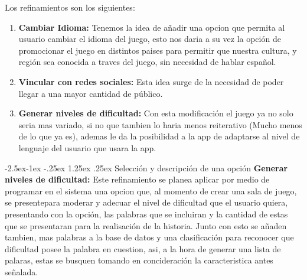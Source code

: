 \documentclass[12pt]{article}
\makeatletter
\renewcommand\paragraph{\@startsection{paragraph}{4}{\z@}%
	{-2.5ex\@plus -1ex \@minus -.25ex}%
	{1.25ex \@plus .25ex}%
	{\normalfont\normalsize\bfseries}}
\makeatother
\begin{document}
Los refinamientos son los siguientes:
\begin{enumerate}[1.]
	\item \textbf{Cambiar Idioma:} Tenemos la idea de añadir una opcion que permita al usuario cambiar el idioma del juego, esto nos daria a su vez la opción de promocionar el juego en distintos paises para permitir que nuestra cultura, y región sea conocida a traves del juego, sin necesidad de hablar español.
	\item \textbf{Vincular con redes sociales:} Esta idea surge de la necesidad de poder llegar a una mayor cantidad de público.
	\item \textbf{Generar niveles de dificultad:} Con esta modificación el juego ya no solo seria mas variado, si no que tambien lo haria menos reiterativo (Mucho menos de lo que ya es), ademas le da la posibilidad a la app de adaptarse al nivel de lenguaje del usuario que usara la app.
\end{enumerate}
\paragraph{Selección y descripción de una opción}
\textbf{Generar niveles de dificultad:} Este refinamiento se planea aplicar por medio de programar en el sistema una opcion que, al momento de crear una sala de juego, se presentepara moderar y adecuar el nivel de dificultad que el usuario quiera, presentando con la opción, las palabras que se incluiran y la cantidad de estas que se presentaran para la realisación de la historia. Junto con esto se añaden tambien, mas palabras a la base de datos y una clasificación para reconocer que dificultad posee la palabra en cuestion, asi, a la hora de generar una lista de palaras, estas se busquen tomando en concideración la caracteristica antes señalada.

\newpage


\newpage

\end{document}
